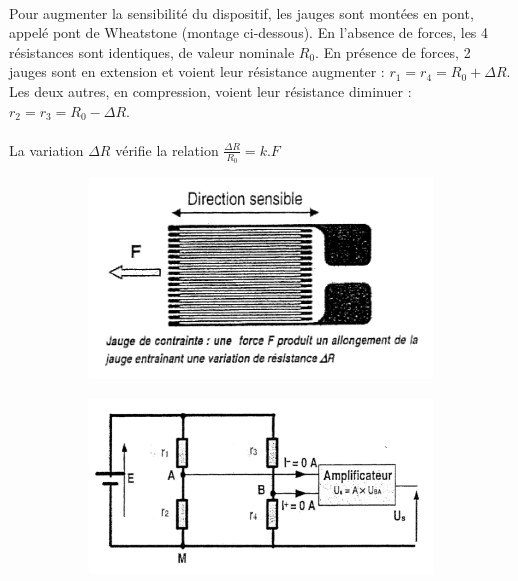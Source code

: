 \documentclass{article}
\begin{document}
\paragraph{}
Pour augmenter la sensibilité du dispositif, les jauges sont montées en pont, appelé pont de Wheatstone (montage ci-dessous). En l'absence de forces, les 4 résistances sont identiques, de valeur nominale $R_0$. En présence de forces, 2 jauges sont en extension et voient leur résistance augmenter : $r_1 = r_4 = R_0 + \Delta R$. Les deux autres, en compression, voient leur résistance diminuer : $r_2 = r_3 = R_0 - \Delta R$.

\paragraph{}
La variation $\Delta R$ vérifie la relation $\frac{\Delta R}{R_0} = k.F$

\begin{figure}[H]
    \centering
    \begin{subfigure}[b]{0.4\linewidth}
        \includegraphics[width=\linewidth]{./images/capteur-force-1.png}
    \end{subfigure}
    \begin{subfigure}[b]{0.5\linewidth}
        \includegraphics[width=\linewidth]{./images/capteur-force-2.png}
    \end{subfigure}
\end{figure}
\end{document}
